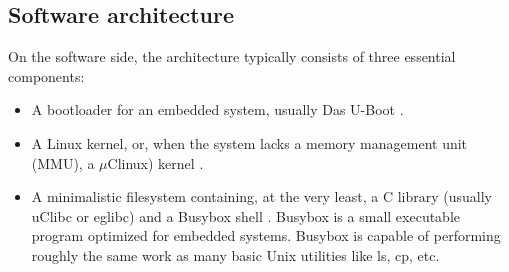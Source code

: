 \documentclass[conference]{IEEEtran}
\newcommand{\nota}[1]{}
\begin{document}
\subsection{Software architecture}

\nota {
En el lado software, la arquitectura consiste típicamente de tres componentes esenciales :
}

On the software side, the architecture typically consists of three essential components:

\nota {
\begin{itemize}
\item Un gestor de arranque (del inglés ``bootloader'') para un sistema embebido,
que generalmente es Das U-Boot \cite{uboot}. Si no se utiliza U-Boot entonces
es posible encontrar un gestor de arranque de código cerrado.
\item Un kernel Linux o uClinux en caso de ser un sistema sin una
unidad de manejo de memoria, MMU (del inglés ``Memory Management Unit''). 
\item Un sistema de archivos mínimo que contiene, al menos, una biblioteca de C
(generalmente uClibc o eglibc), y Busybox, el cual es un pequeño programa ejecutable,
optimizado para sistemas embebidos, que puede realizar las operaciones
de muchas de las utilidades  básicas de UNIX (ls, cp, etc.).
\end{itemize}
}

\begin{itemize}
\item A bootloader for an embedded system, usually Das U-Boot \cite{uboot}.
\item A Linux kernel, or, when the system lacks a memory management unit (MMU), a
$\mu$Clinux) kernel \cite{linux, uclinux}.
\item A minimalistic filesystem containing, at the very least, a C library (usually uClibc or eglibc) and a Busybox shell \cite{busybox}. Busybox is a small executable program optimized for embedded systems. Busybox is capable of performing roughly the same work as many basic Unix utilities like ls, cp, etc.
\end{itemize}
\nota {
Algunas veces existe un cuarto componente de software, que son las aplicaciones
y controladores de hardware (del inglés ``drivers'') del fabricante.
Las aplicaciones muchas veces no son de interés, pero si los controladores.
Si existiesen controladores de código cerrado
entonces el trabajo de preparar un Linux embebido con soporte
para todo el hardware será difícil (debido a que no se tiene acceso
al código fuente). En nuestra experiencia con el ENTC-1000 no encontramos drivers
de código cerrado, por lo que este punto está fuera del alcance de este artículo. 
}
\end{document}
